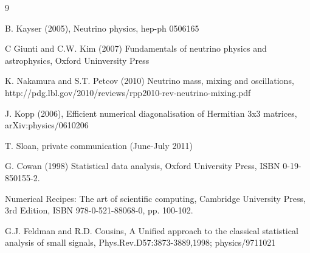 %
%

\begin{thebibliography}{9}
 
  B. Kayser (2005), Neutrino physics, hep-ph 0506165

  C Giunti and C.W. Kim (2007) Fundamentals of neutrino physics and astrophysics, Oxford Uninversity Press

  K. Nakamura and S.T. Petcov (2010) Neutrino mass, mixing and oscillations,
  http://pdg.lbl.gov/2010/reviews/rpp2010-rev-neutrino-mixing.pdf

  J. Kopp (2006), Efficient numerical diagonalisation of Hermitian 3x3 matrices, arXiv:physics/0610206
  
  T. Sloan, private communication (June-July 2011)
  
  G. Cowan (1998) Statistical data analysis,
  Oxford University Press, ISBN 0-19-850155-2.

  Numerical Recipes: The art of scientific computing,
  Cambridge University Press, 3rd Edition, ISBN 978-0-521-88068-0, pp. 100-102.

  G.J. Feldman and R.D. Cousins,
  A Unified approach to the classical statistical analysis of small signals,
  Phys.Rev.D57:3873-3889,1998; physics/9711021
  
  
\end{thebibliography}
